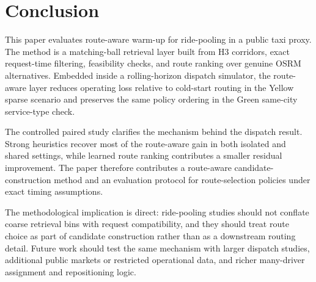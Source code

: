 \documentclass[journal]{IEEEtran}
\begin{document}
\section{Conclusion}
This paper evaluates route-aware warm-up for ride-pooling in a public taxi proxy. The method is a matching-ball retrieval layer built from H3 corridors, exact request-time filtering, feasibility checks, and route ranking over genuine OSRM alternatives. Embedded inside a rolling-horizon dispatch simulator, the route-aware layer reduces operating loss relative to cold-start routing in the Yellow sparse scenario and preserves the same policy ordering in the Green same-city service-type check.

The controlled paired study clarifies the mechanism behind the dispatch result. Strong heuristics recover most of the route-aware gain in both isolated and shared settings, while learned route ranking contributes a smaller residual improvement. The paper therefore contributes a route-aware candidate-construction method and an evaluation protocol for route-selection policies under exact timing assumptions.

The methodological implication is direct: ride-pooling studies should not conflate coarse retrieval bins with request compatibility, and they should treat route choice as part of candidate construction rather than as a downstream routing detail. Future work should test the same mechanism with larger dispatch studies, additional public markets or restricted operational data, and richer many-driver assignment and repositioning logic.



\end{document}
